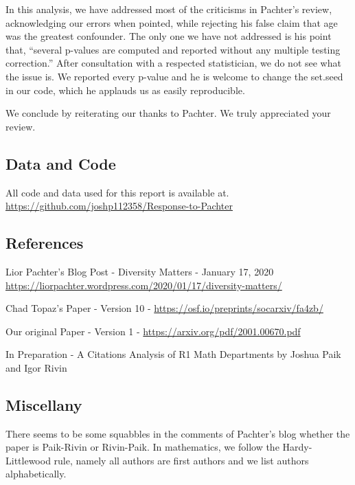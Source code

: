 \documentclass[]{article}
\begin{document}
In this analysis, we have addressed most of the criticisms in Pachter's
review, acknowledging our errors when pointed, while rejecting his false
claim that age was the greatest confounder. The only one we have not
addressed is his point that, ``several p-values are computed and
reported without any multiple testing correction.'' After consultation
with a respected statistician, we do not see what the issue is. We
reported every p-value and he is welcome to change the set.seed in our
code, which he applauds us as easily reproducible.

We conclude by reiterating our thanks to Pachter. We truly appreciated
your review.

\hypertarget{data-and-code}{%
\subsection{Data and Code}\label{data-and-code}}

All code and data used for this report is available at.
\url{https://github.com/joshp112358/Response-to-Pachter}

\hypertarget{references}{%
\subsection{References}\label{references}}

Lior Pachter's Blog Post - Diversity Matters - January 17, 2020
\url{https://liorpachter.wordpress.com/2020/01/17/diversity-matters/}

Chad Topaz's Paper - Version 10 -
\url{https://osf.io/preprints/socarxiv/fa4zb/}

Our original Paper - Version 1 -
\url{https://arxiv.org/pdf/2001.00670.pdf}

In Preparation - A Citations Analysis of R1 Math Departments by Joshua
Paik and Igor Rivin

\hypertarget{miscellany}{%
\subsection{Miscellany}\label{miscellany}}

There seems to be some squabbles in the comments of Pachter's blog
whether the paper is Paik-Rivin or Rivin-Paik. In mathematics, we follow
the Hardy-Littlewood rule, namely all authors are first authors and we
list authors alphabetically.
\end{document}
